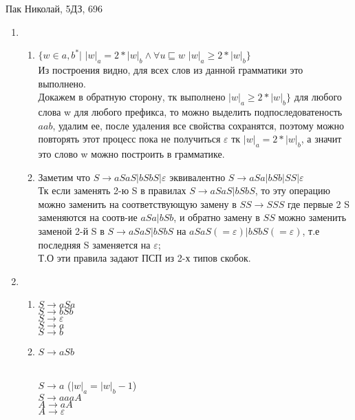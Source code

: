 \documentclass{article}
\begin{document}
\LARGE
	Пак Николай, 5ДЗ, 696\\
	\begin{enumerate}
		\item 
			\begin{enumerate}
				\item
					$\{w \in {a,b}^* |$ $|w|_a = 2*|w|_b \land \forall u \sqsubseteq w$  $|w|_a \ge 2*|w|_b\}$\\
					Из построения видно, для всех слов из данной грамматики это выполнено.\\
					Докажем в обратную сторону, тк выполнено  $|w|_a \ge 2*|w|_b\}$ для любого слова w для любого префикса, то можно выделить подпоследоватеность $aab$, удалим ее, после удаления все свойства сохранятся, поэтому можно повторять этот процесс пока не получиться $\varepsilon$ тк $|w|_a = 2*|w|_b$, а значит это слово w можно построить в грамматике.    \\
				\item
					Заметим что $S \rightarrow aSaS | bSbS|\varepsilon$ эквивалентно $S \rightarrow aSa |bSb| SS| \varepsilon$\\
					Тк если заменять 2-ю S в правилах $S \rightarrow aSaS | bSbS$, то эту операцию можно заменить на соответствующую замену в $SS \rightarrow SSS$ где первые 2 S заменяются на соотв-ие $aSa |bSb$, и обратно замену в $SS$ можно заменить заменой 2-й S в $S \rightarrow aSaS | bSbS$ на $aSaS(=\varepsilon) | bSbS(=\varepsilon)$, т.е последняя S заменяется на $\varepsilon$;\\
					Т.О эти правила задают ПСП из 2-х типов скобок. 
			\end{enumerate}
		
		\item
			\begin{enumerate}
				\item
					$S \rightarrow aSa$\\
					$S \rightarrow bSb$\\
					$S \rightarrow \varepsilon$\\
					$S \rightarrow a$\\
					$S \rightarrow b$\\
				\item
					$S \rightarrow aSb$\\\
					
					$S \rightarrow a$  ($|w|_a =| w|_b - 1$)\\
					$S \rightarrow aaaA$\\
					$A \rightarrow aA$\\
					$A \rightarrow \varepsilon$\\							
					

\end{enumerate}
\end{enumerate}
\end{document}
